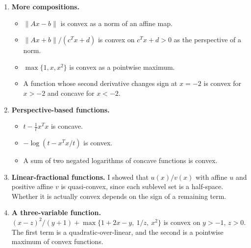 \begin{enumerate}
  \item \textbf{More compositions.}
    \begin{itemize}
      \item $\|Ax-b\|$ is convex as a norm of an affine map.
      \item $\|Ax+b\|/(c^Tx+d)$ is convex on $c^Tx+d>0$ as the perspective of a norm.
      \item $\max\{1,x,x^2\}$ is convex as a pointwise maximum.
      \item A function whose second derivative changes sign at $x=-2$ is convex for $x>-2$ and concave for $x<-2$.
    \end{itemize}
  \item \textbf{Perspective-based functions.}
    \begin{itemize}
      \item $t - \tfrac{1}{t}x^Tx$ is concave.
      \item $-\log(t - x^Tx/t)$ is convex.
      \item A sum of two negated logarithms of concave functions is convex.
    \end{itemize}
  \item \textbf{Linear-fractional functions.} I showed that $u(x)/v(x)$ with affine $u$ and positive affine $v$ is quasi-convex, since each sublevel set is a half-space. Whether it is actually convex depends on the sign of a remaining term.
  \item \textbf{A three-variable function.} $(x-z)^2/(y+1) + \max\{1+2x-y,\ 1/z,\ x^2\}$ is convex on $y>-1$, $z>0$. The first term is a quadratic-over-linear, and the second is a pointwise maximum of convex functions.
\end{enumerate}

